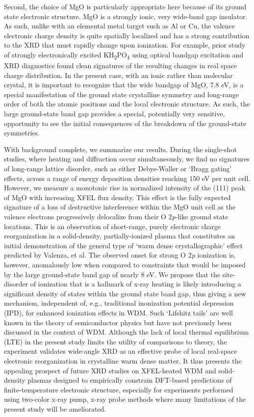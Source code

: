 Second, the choice of MgO is particularly appropriate here because of
its ground state electronic structure. MgO is a strongly ionic, very
wide-band gap insulator. As such, unlike with an elemental metal target
such as Al or Cu, the valence electronic charge density is quite
spatially localized and has a strong contribution to the XRD that must
rapidly change upon ionization. For example, prior study of strongly
electronically excited KH\textsubscript{2}PO\textsubscript{4} using
optical bandgap excitation and XRD diagnostics found clean signatures of
the resulting changes in real space charge distribution. In the present
case, with an ionic rather than molecular crystal, it is important to
recognize that the wide bandgap of MgO, 7.8 eV, is a special
manifestation of the ground state crystalline symmetry and long-range
order of both the atomic positions and the local electronic structure.
As such, the large ground-state band gap provides a special, potentially
very sensitive, opportunity to see the initial consequences of the
breakdown of the ground-state symmetries.

With background complete, we summarize our results. During the
single-shot studies, where heating and diffraction occur simultaneously,
we find no signatures of long-range lattice disorder, such as either
Debye-Waller or `Bragg gating' effects, across a range of energy
deposition densities reaching 150 eV per unit cell. However, we measure
a monotonic rise in normalized intensity of the (111) peak of MgO with
increasing XFEL flux density. This effect is the fully expected
signature of a loss of destructive interference within the MgO unit cell
as the valence electrons progressively delocalize from their O
2\emph{p}-like ground state locations. This is an observation of
short-range, purely electronic charge reorganization in a solid-density,
partially-ionized plasma that constitutes an initial demonstration of
the general type of `warm dense crystallographic' effect predicted by
Valenza, et al. \cite{VALENZA2016WARM} The observed onset for strong O 2\emph{p}
ionization is, however, anomalously low when compared to constraints
that would be imposed by the large ground-state band gap of nearly 8 eV.
We propose that the site-disorder of ionization that is a hallmark of
x-ray heating is likely introducing a significant density of states
within the ground state band gap, thus giving a new mechanism,
independent of, e.g., traditional inonization potential depression
(IPD), for enhanced ionization effects in WDM. Such `Lifshitz tails' are
well known in the theory of semiconductor physics but have not
previously been discussed in the context of WDM. Although the lack of
local thermal equilibrium (LTE) in the present study limits the utility
of comparisons to theory, the experiment validates wide-angle XRD as an
effective probe of local real-space electronic reorganization in
crystalline warm dense matter. It thus presents the appealing prospect
of future XRD studies on XFEL-heated WDM and solid-density plasmas
designed to empirically constrain DFT-based predictions of
finite-temperature electronic structure, especially for experiments
performed using two-color x-ray pump, x-ray probe methods where many
limitations of the present study will be ameliorated.

